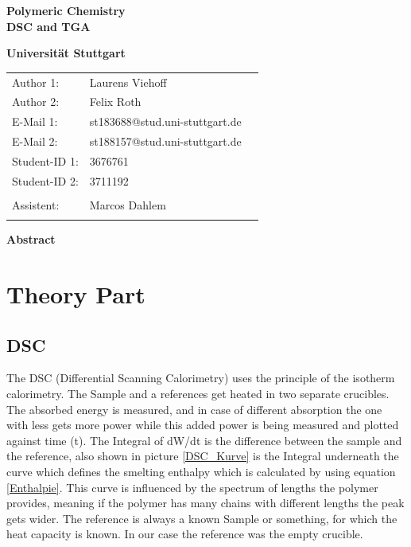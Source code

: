 \documentclass[10pt,a4paper,ngerman]{scrartcl}
\begin{document}
\begin{titlepage}
	\vspace*{2,5cm}
	\begin{center}
		\begin{LARGE}
			\textbf{Polymeric Chemistry}\\
			\textbf{DSC and TGA}\\
		\end{LARGE}
		\vspace{1cm}
		\textbf{Universität Stuttgart}\\
		\vspace*{1,5cm}
		\begin{tabular}{lp{}l}
			Author 1:     &Laurens Viehoff\\
            Author 2:     &Felix Roth\\   
			E-Mail 1:      &st183688@stud.uni-stuttgart.de\\
            E-Mail 2:      &st188157@stud.uni-stuttgart.de  \\
			Student-ID 1: & 3676761   \\ 
            Student-ID 2: & 3711192 \\ \\
			Assistent:  &Marcos Dahlem   \\ \\ 
		\end{tabular}
	\end{center}

    \begin{center}
        \textbf{\Large Abstract}
    \end{center}
    
\end{titlepage}
\thispagestyle{empty}
\renewcommand{\thepage}{\arabic{page}}
\newpage
\tableofcontents
\setcounter{page}{1}
\renewcommand{\thepage}{\arabic{page}}
\newpage

\section{Theory Part}

    \subsection{DSC}

        The DSC (Differential Scanning Calorimetry) uses the principle of the isotherm calorimetry. The Sample and a references get heated in two separate crucibles. 
        The absorbed energy is measured, and in case of different absorption the one with less gets more power while this added power is being measured and plotted against time (t).
        The Integral of dW/dt is the difference between the sample and the reference, also shown in picture \ref{DSC_Kurve} is the Integral underneath the curve which defines the smelting 
        enthalpy which is calculated by using equation \eqref{Enthalpie}. This curve is influenced by the spectrum of lengths the polymer provides, 
        meaning if the polymer has many chains with different lengths the peak gets wider. 
        The reference is always a known Sample or something, for which the heat capacity is known. 
        In our case the reference was the empty crucible.
\end{document}
